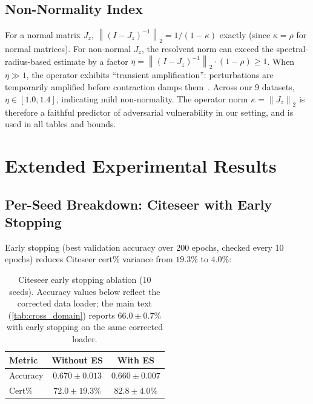 \documentclass[conference]{IEEEtran}
\newcommand{\norm}[1]{\left\|#1\right\|}
\begin{document}
\subsection{Non-Normality Index}

For a normal matrix $J_z$, $\norm{(I-J_z)^{-1}}_2 = 1/(1-\kappa)$ exactly (since $\kappa = \rho$ for normal matrices). For non-normal $J_z$, the resolvent norm can exceed the spectral-radius-based estimate by a factor $\eta = \norm{(I-J_z)^{-1}}_2 \cdot (1-\rho) \geq 1$. When $\eta \gg 1$, the operator exhibits ``transient amplification'': perturbations are temporarily amplified before contraction damps them~\cite{trefethen2005spectra}. Across our 9 datasets, $\eta \in [1.0, 1.4]$, indicating mild non-normality. The operator norm $\kappa = \norm{J_z}_2$ is therefore a faithful predictor of adversarial vulnerability in our setting, and is used in all tables and bounds.

\section{Extended Experimental Results}
\label{app:extended}

\subsection{Per-Seed Breakdown: Citeseer with Early Stopping}

Early stopping (best validation accuracy over 200 epochs, checked every 10 epochs) reduces Citeseer cert\% variance from $19.3\%$ to $4.0\%$:

\begin{table}[h]
\centering
\caption{Citeseer early stopping ablation (10 seeds). Accuracy values below reflect the corrected data loader; the main text (\cref{tab:cross_domain}) reports $66.0 \pm 0.7\%$ with early stopping on the same corrected loader.}
\small
\begin{tabular}{@{}lcc@{}}
\toprule
Metric & Without ES & With ES \\
\midrule
Accuracy      & $0.670 \pm 0.013$ & $0.660 \pm 0.007$ \\
Cert\%        & $72.0 \pm 19.3\%$ & $82.8 \pm 4.0\%$ \\
\bottomrule
\end{tabular}
\end{table}
\end{document}
